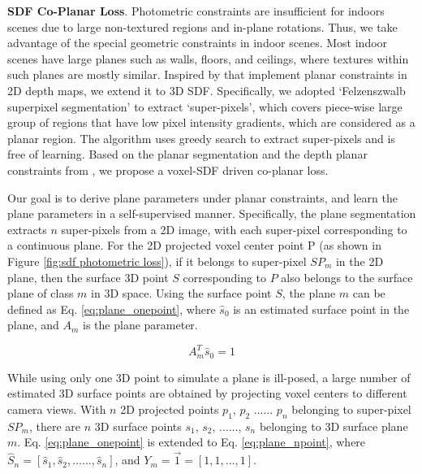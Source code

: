 \noindent
\textbf{SDF Co-Planar Loss}. Photometric constraints are insufficient for indoors scenes due to large non-textured regions and in-plane rotations. Thus, we take advantage of the special geometric constraints in indoor scenes. Most indoor scenes have large planes such as walls, floors, and ceilings, where textures within such planes are mostly similar. Inspired by \cite{p2net, planercnn, planenet, piece-wise} that implement planar constraints in 2D depth maps, we extend it to 3D SDF. Specifically, we adopted `Felzenszwalb superpixel segmentation' \cite{plane_seg} to extract `super-pixels', which covers piece-wise large group of regions that have low pixel intensity gradients, which are considered as a planar region. The algorithm uses greedy search to extract super-pixels and is free of learning. Based on the planar segmentation and the depth planar constraints from \cite{structdepth}, we propose a voxel-SDF driven co-planar loss.

Our goal is to derive plane parameters under planar constraints, and learn the plane parameters in a self-supervised manner. Specifically, the plane segmentation extracts $n$ super-pixels from a 2D image, with each super-pixel corresponding to a continuous plane. For the 2D projected voxel center point P (as shown in Figure \ref{fig:sdf photometric loss}), if it belongs to super-pixel $SP_m$ in the 2D plane, then the surface 3D point $S$ corresponding to $P$ also belongs to the surface plane of class $m$ in 3D space. Using the surface point $S$, the plane $m$ can be defined as Eq. \ref{eq:plane_onepoint}, where $\hat{s}_{0}$ is an estimated surface point in the plane, and $A_m$ is the plane parameter.

\vspace{-3mm}
\begin{equation}
    A_{m}^T \hat{s}_{0} = 1
    \label{eq:plane_onepoint}
\end{equation}
\vspace{-5mm}

While using only one 3D point to simulate a plane is ill-posed, a large number of estimated 3D surface points are obtained by projecting voxel centers to different camera views. With $n$ 2D projected points $p_1$, $p_2$ ...... $p_n$ belonging to super-pixel $SP_m$, there are $n$ 3D surface points $s_1$, $s_2$, ......, $s_n$ belonging to 3D surface plane $m$. Eq. \ref{eq:plane_onepoint} is extended to Eq. \ref{eq:plane_npoint}, where $\hat{S}_{n} = [\hat{s}_{1}, \hat{s}_{2}, ......, \hat{s}_{n}]$, and $Y_m = \Vec{1} = [1,1,...,1]$.

